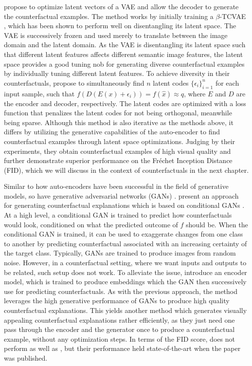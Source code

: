 \documentclass[11pt,a4paper,twoside,openright,final]{memoir}
\begin{document}
\citet{Rodriguez2021} propose to optimize latent vectors of a VAE and allow the decoder to generate the counterfactual examples.  
The method works by initially training a $\beta$-TCVAE \cite{disentangle_vae}, which has been shown to perform well on disentangling its latent space.
The VAE is successively frozen and used merely to translate between the image domain and the latent domain.
As the VAE is disentangling its latent space such that different latent features affects different semantic image features, the latent space provides a good tuning nob for generating diverse counterfactual examples by individually tuning different latent features.
To achieve diversity in their counterfactuals, \citet{Rodriguez2021} propose to simultaneously find $n$ latent codes $\{\epsilon_i\}_{i=1}^n$ for each input sample, such that $f(D( E(x) + \epsilon_i) ) = f(\hat x) \approx q$, where $E$ and $D$ are the encoder and decoder, respectively.
The latent codes are optimized with a loss function that penalizes the latent codes for not being orthogonal, meanwhile being sparse.
Although this method is also iterative as the methods above, it differs by utilizing the generative capabilities of the auto-encoder to find counterfactual examples through latent space optimizations.
Judging by their experiments, they obtain counterfactual examples of high visual quality and further demonstrate superior performance on the Fr\'echet Inception Distance (FID), which we will discuss in the context of counterfactuals in the next chapter.

Similar to how auto-encoders have been successful in the field of generative models, so have generative adversarial networks (GANs) \cite{gans}.
\citet{Singla2019} present an approach for generating counterfactual explanations which is based on conditional GANs \cite{conditionalgan}.
At a high level, a conditional GAN is trained to predict how counterfactuals would look, conditioned on what the predicted outcome of $f$ should be. 
When the conditional GAN is trained, it can be used to exaggerate changes from one class to another by predicting counterfactual associated with an increasing certainty of the target class.
Typically, GANs are trained to produce images from random noise.
However, in a counterfactual setting, where we want inputs and outputs to be related, such setup does not work. 
To alleviate the issue, \citet{Singla2019} introduce an encoder model, which is trained to produce embeddings which the GAN then successively use for predicting counterfactuals. 
As with the previous approach, the method leverages the high generative performance of GANs to produce high quality counterfactual explanations.
This yields another method which generates visually appealing counterfactual explanations rather efficiently, as they just need one pass through the encoder and the generator once to produce a counterfactual example, without any optimization steps.  
In terms of the FID score, \cite{Singla2019} does not perform as well as \cite{Rodriguez2021}, but their performance held state-of-the-art when the paper was published.
\end{document}
